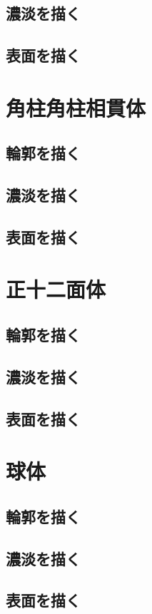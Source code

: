 \documentclass[a4paper,11pt]{jsbook}
\begin{document}
\section{濃淡を描く}
\section{表面を描く}

\chapter{角柱角柱相貫体}
\section{輪郭を描く}
\section{濃淡を描く}
\section{表面を描く}

\chapter{正十二面体}
\section{輪郭を描く}
\section{濃淡を描く}
\section{表面を描く}

\chapter{球体}
\section{輪郭を描く}
\section{濃淡を描く}
\section{表面を描く}
\end{document}
